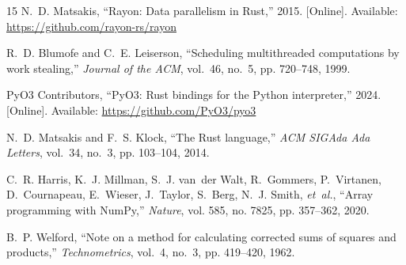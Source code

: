 \documentclass[conference]{IEEEtran}
\begin{document}
\begin{thebibliography}{15}
N.~D. Matsakis, ``Rayon: Data parallelism in {Rust},'' 2015. [Online]. Available: \url{https://github.com/rayon-rs/rayon}

R.~D. Blumofe and C.~E. Leiserson, ``Scheduling multithreaded computations by work stealing,'' \emph{Journal of the ACM}, vol.~46, no.~5, pp. 720--748, 1999.

{PyO3 Contributors}, ``{PyO3}: Rust bindings for the {Python} interpreter,'' 2024. [Online]. Available: \url{https://github.com/PyO3/pyo3}

N.~D. Matsakis and F.~S. Klock, ``The {Rust} language,'' \emph{ACM SIGAda Ada Letters}, vol.~34, no.~3, pp. 103--104, 2014.

C.~R. Harris, K.~J. Millman, S.~J. van~der Walt, R.~Gommers, P.~Virtanen, D.~Cournapeau, E.~Wieser, J.~Taylor, S.~Berg, N.~J. Smith, \emph{et~al.}, ``Array programming with {NumPy},'' \emph{Nature}, vol. 585, no. 7825, pp. 357--362, 2020.

B.~P. Welford, ``Note on a method for calculating corrected sums of squares and products,'' \emph{Technometrics}, vol.~4, no.~3, pp. 419--420, 1962.

\end{thebibliography}
\end{document}
